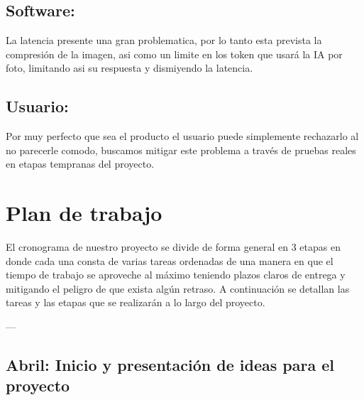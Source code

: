 \documentclass{article}
\begin{document}
        \subsection{Software:}La latencia presente una gran problematica, por lo tanto esta prevista la compresión de la imagen, asi como un limite en los token que usará la IA por foto, limitando asi su respuesta y dismiyendo la latencia.

        \subsection{Usuario:}Por muy perfecto que sea el producto el usuario puede simplemente rechazarlo al no parecerle comodo, buscamos mitigar este problema a través de pruebas reales en etapas tempranas del proyecto. 
    \newpage
    \section{Plan de trabajo}
    El cronograma de nuestro proyecto se divide de forma general en 3 etapas en donde cada una consta de varias tareas ordenadas de una manera en que el tiempo de trabajo se aproveche al máximo teniendo plazos claros de entrega y mitigando el peligro de que exista algún retraso. A continuación se detallan las tareas y las etapas que se realizarán a lo largo del proyecto.

---

\subsection*{Abril: Inicio y presentación de ideas para el proyecto}
\end{document}
